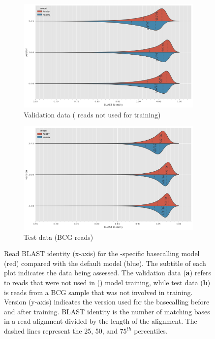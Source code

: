 \begin{figure}
     \centering
     \begin{subfigure}[b]{0.9\textwidth}
        \includegraphics[width=1\linewidth]{Chapter4/Figs/read_blast_identity.png}
        \centering
        \caption{Validation data (\mtb{} reads not used for training)}
        \label{fig:eval-read-blast}
     \end{subfigure}
     \hfill
     \begin{subfigure}[b]{0.9\textwidth}
         \centering
        \includegraphics[width=1\linewidth]{Chapter4/Figs/test_read_blast_identity.png}
         \caption{Test data (BCG reads)}
         \label{fig:test-read-blast}
     \end{subfigure}
    \caption{Read BLAST identity (x-axis) for the \mtb{}-specific basecalling model \tubby{} (red) compared with the default \guppy{} model (blue). The subtitle of each plot indicates the data being assessed. The validation data (\textbf{a}) refers to \mtb{} reads that were not used in (\tubby{}) model training, while test data (\textbf{b}) is reads from a BCG sample that was not involved in training. Version (y-axis) indicates the \guppy{} version used for the basecalling before and after training. BLAST identity is the number of matching bases in a read alignment divided by the length of the alignment. The dashed lines represent the 25, 50, and $75^{th}$ percentiles.}
        \label{fig:read-blast}
\end{figure}

